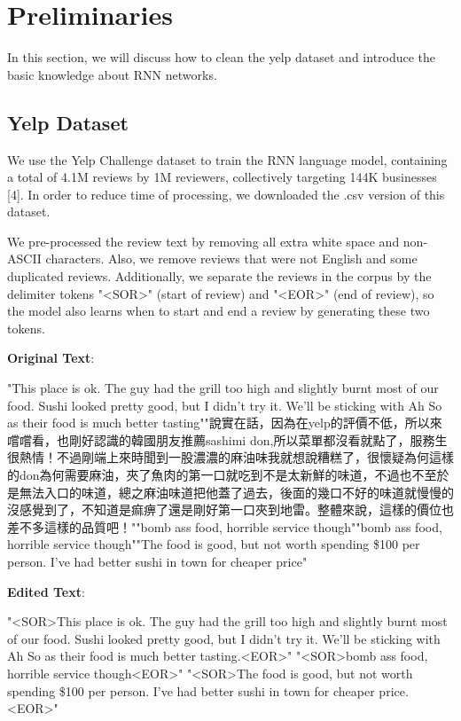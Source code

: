 \documentclass[conference]{IEEEtran}
\begin{document}
\section{Preliminaries}
In this section, we will discuss how to clean the yelp dataset and introduce the basic knowledge about RNN networks.
\subsection{Yelp Dataset}
\par We use the Yelp Challenge dataset to train the RNN language model, containing a total of 4.1M reviews by 1M
reviewers, collectively targeting 144K businesses [4]. In order to reduce time of processing, we downloaded the .csv version of this dataset.
\par We pre-processed the review text by removing all extra white space and non-ASCII characters. Also, we remove reviews that were not English and some duplicated reviews. Additionally, we separate the reviews in the corpus by the delimiter tokens "<SOR>" (start of review) and "<EOR>" (end of review), so the model also learns when to start and end a review by generating these two tokens.
\par \textbf {Original Text}:
\par "This place is ok. The guy had the grill too high and slightly burnt most of our food. Sushi looked pretty good, but I didn't try it. We'll be sticking with Ah So as their food is much better tasting""說實在話，因為在yelp的評價不低，所以來嚐嚐看，也剛好認識的韓國朋友推薦sashimi don,所以菜單都沒看就點了，服務生很熱情！不過剛端上來時聞到一股濃濃的麻油味我就想說糟糕了，很懷疑為何這樣的don為何需要麻油，夾了魚肉的第一口就吃到不是太新鮮的味道，不過也不至於是無法入口的味道，總之麻油味道把他蓋了過去，後面的幾口不好的味道就慢慢的沒感覺到了，不知道是痲痹了還是剛好第一口夾到地雷。整體來說，這樣的價位也差不多這樣的品質吧！""bomb ass food, horrible service though""bomb ass food, horrible service though""The food is good, but not worth spending \$100 per person.  I've had better sushi in town for cheaper price"
\par \textbf{Edited Text}:
\par "<SOR>This place is ok. The guy had the grill too high and slightly burnt most of our food. Sushi looked pretty good, but I didn't try it. We'll be sticking with Ah So as their food is much better tasting.<EOR>"
"<SOR>bomb ass food, horrible service though<EOR>"
"<SOR>The food is good, but not worth spending \$100 per person.  I've had better sushi in town for cheaper price.<EOR>"
\end{document}

